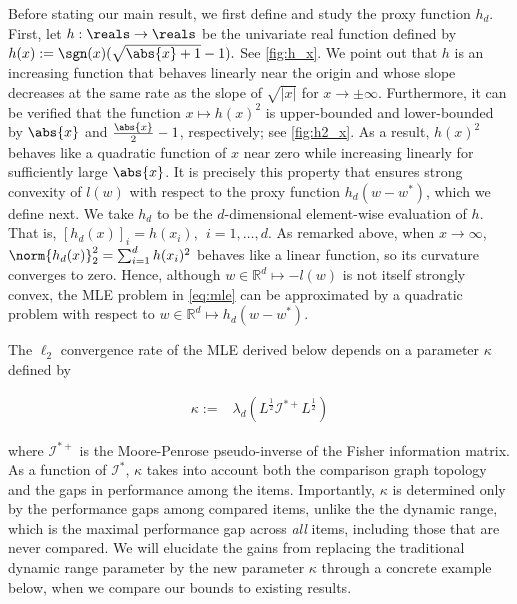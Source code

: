 Before stating our main result, we first define and study the proxy function $h_d$. First, let $h:\reals \rightarrow \reals$ be the univariate real function defined by $ h(x) := \sgn(x) (\sqrt{\abs{x}+1}-1).
$
See \ref{fig:h_x}. We point out that $h$ is an increasing function that behaves linearly near the origin and whose slope decreases at the same rate as the slope of $\sqrt{|x|}$ for  $x \rightarrow \pm \infty$. Furthermore, it can be verified that the function $x \mapsto h(x)^2$ is upper-bounded and lower-bounded by $\abs{x}$ and $\frac{\abs{x}}{2}-1$, respectively; see  \ref{fig:h2_x}. As a result, $h(x)^2$ behaves like a quadratic function of $x$ near zero while  increasing linearly for sufficiently large $\abs{x}$. It is precisely this property that ensures strong convexity of $l(w)$ with respect to the proxy function $h_d(w - w^*)$, which we define next. We take $h_d$ to be the $d$-dimensional element-wise evaluation of $h$. That is, $ [h_d(x)]_i = h(x_i), ~~ i = 1, \dots, d. $ As remarked above, when  $x \rightarrow \infty$, $\norm{h_d(x)}_2^2 = \sum_{i=1}^d h(x_i)^2$ behaves like a linear function, so its curvature converges to zero. Hence, although $w \in \mathbb{R}^d \mapsto -l(w)$ is not itself strongly convex, the MLE problem in \ref{eq:mle} can be approximated by a quadratic problem with respect to $w \in \mathbb{R}^d \mapsto h_d(w - w^*)$. 

The $\ell_2$ convergence rate of the MLE derived below depends on a parameter $\kappa$ 
defined by

\begin{equation}
\begin{split}
    \kappa := & \lambda_{d} (L^{\frac{1}{2}} \mathcal{I}^{*+} L^{\frac{1}{2}}) 

\end{split}
\end{equation}

 
where $\mathcal{I}^{*+}$ is the Moore-Penrose pseudo-inverse of the Fisher information matrix. As a function of $\mathcal{I}^*$, $\kappa$ takes into account  both the comparison graph topology and the gaps in performance among the items. Importantly, $\kappa$ is determined  only by  the performance gaps among compared items, unlike the the dynamic range, which is the maximal performance gap across {\it all} items, including those that are never compared. We will elucidate the gains from replacing the traditional dynamic range parameter by the new parameter $\kappa$ through a concrete example below, when we compare our bounds to existing results.

